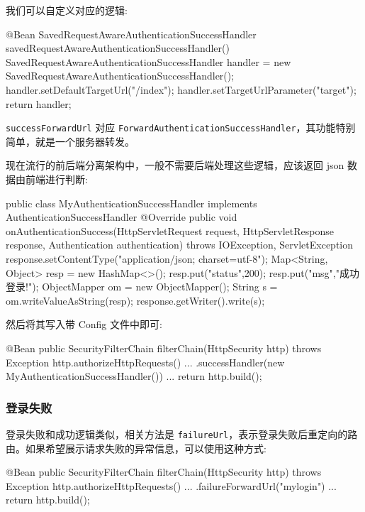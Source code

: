 我们可以自定义对应的逻辑:
\begin{Java}
@Bean
SavedRequestAwareAuthenticationSuccessHandler savedRequestAwareAuthenticationSuccessHandler() {
    SavedRequestAwareAuthenticationSuccessHandler handler = new SavedRequestAwareAuthenticationSuccessHandler();
    handler.setDefaultTargetUrl("/index");
    handler.setTargetUrlParameter("target");
    return handler;
}
\end{Java}

\texttt{successForwardUrl} 对应 \texttt{ForwardAuthenticationSuccessHandler}，其功能特别简单，就是一个服务器转发。

现在流行的前后端分离架构中，一般不需要后端处理这些逻辑，应该返回 json 数据由前端进行判断:

\begin{Java}
public class MyAuthenticationSuccessHandler implements AuthenticationSuccessHandler {
    @Override
    public void onAuthenticationSuccess(HttpServletRequest request, HttpServletResponse response, Authentication authentication) throws IOException, ServletException {
        response.setContentType("application/json; charset=utf-8");
        Map<String, Object> resp = new HashMap<>();
        resp.put("status",200);
        resp.put("msg","成功登录!");
        ObjectMapper om = new ObjectMapper();
        String s = om.writeValueAsString(resp);
        response.getWriter().write(s);
    }
}
\end{Java}

然后将其写入带 Config 文件中即可:

\begin{Java}
@Bean
public SecurityFilterChain filterChain(HttpSecurity http) throws Exception {
    http.authorizeHttpRequests()
            ...
            .successHandler(new MyAuthenticationSuccessHandler())
            ...
    return http.build();
}
\end{Java}

\subsubsection{登录失败}

登录失败和成功逻辑类似，相关方法是 \texttt{failureUrl}，表示登录失败后重定向的路由。如果希望展示请求失败的异常信息，可以使用这种方式:

\begin{Java}
@Bean
public SecurityFilterChain filterChain(HttpSecurity http) throws Exception {
    http.authorizeHttpRequests()
        ...
        .failureForwardUrl("mylogin")
        ...
    return http.build();
}
\end{Java}

